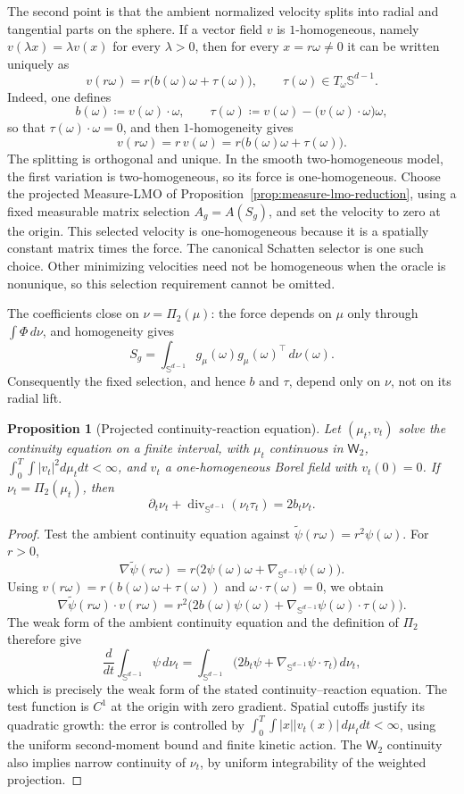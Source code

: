 \documentclass{article}
\newtheorem{proposition}[theorem]{Proposition}
\newcommand{\Sd}{\mathbb{S}^{d-1}}
\newcommand{\Wtwo}{\mathsf{W}_2}
\newcommand{\divS}{\operatorname{div}_{\Sd}}
\newcommand{\nablaS}{\nabla_{\Sd}}
\begin{document}
The second point is that the ambient normalized velocity splits into radial and tangential parts on the sphere. If a vector field $v$ is $1$-homogeneous, namely $v(\lambda x)=\lambda v(x)$ for every $\lambda>0$, then for every $x=r\omega\neq 0$ it can be written uniquely as
$$
v(r\omega)=r\bigl(b(\omega)\omega+\tau(\omega)\bigr),
\qquad
\tau(\omega)\in T_\omega \Sd.
$$
Indeed, one defines
$$
b(\omega)\coloneqq v(\omega)\cdot \omega,
\qquad
\tau(\omega)\coloneqq v(\omega)-\bigl(v(\omega)\cdot \omega\bigr)\omega,
$$
so that $\tau(\omega)\cdot \omega=0$, and then $1$-homogeneity gives
$$
v(r\omega)=r\,v(\omega)=r\bigl(b(\omega)\omega+\tau(\omega)\bigr).
$$
The splitting is orthogonal and unique. In the smooth two-homogeneous model,
the first variation is two-homogeneous, so its force is one-homogeneous.
Choose the projected Measure-LMO of
Proposition~\ref{prop:measure-lmo-reduction}, using a fixed measurable matrix
selection $A_g=A(S_g)$, and set the velocity to zero at the origin.
This selected velocity is one-homogeneous because it is a spatially constant
matrix times the force. The canonical Schatten selector is one such choice.
Other minimizing velocities need not be homogeneous when the oracle is
nonunique, so this selection requirement cannot be omitted.

The coefficients close on $\nu=\Pi_2(\mu)$: the force depends on $\mu$ only
through $\int\Phi\,d\nu$, and homogeneity gives
\[
 S_g=\int_{\Sd}g_\mu(\omega)g_\mu(\omega)^\top\,d\nu(\omega).
\]
Consequently the fixed selection, and hence $b$ and $\tau$, depend only on
$\nu$, not on its radial lift.
\begin{proposition}[Projected continuity-reaction equation]
\label{prop:sphere}
Let $(\mu_t,v_t)$ solve the continuity equation on a finite interval, with
$\mu_t$ continuous in $\Wtwo$, $\int_0^T\int|v_t|^2d\mu_tdt<\infty$, and
$v_t$ a one-homogeneous Borel field with $v_t(0)=0$. If
$\nu_t=\Pi_2(\mu_t)$, then
$$
\partial_t\nu_t+\divS(\nu_t\tau_t)=2b_t\nu_t.
$$
\end{proposition}

\begin{proof}
Test the ambient continuity equation against
$\widetilde\psi(r\omega)=r^2\psi(\omega)$. For $r>0$,
\[
 \nabla\widetilde\psi(r\omega)
 =r\bigl(2\psi(\omega)\omega+\nablaS\psi(\omega)\bigr).
\]
Using $v(r\omega)=r(b(\omega)\omega+\tau(\omega))$ and
$\omega\cdot\tau(\omega)=0$, we obtain
\[
 \nabla\widetilde\psi(r\omega)\cdot v(r\omega)
 =r^2\bigl(2b(\omega)\psi(\omega)
            +\nablaS\psi(\omega)\cdot\tau(\omega)\bigr).
\]
The weak form of the ambient continuity equation and the definition of
$\Pi_2$ therefore give
\[
 \frac{d}{dt}\int_{\Sd}\psi\,d\nu_t
 =\int_{\Sd}
   \bigl(2b_t\psi+\nablaS\psi\cdot\tau_t\bigr)\,d\nu_t,
\]
which is precisely the weak form of the stated continuity--reaction equation.
The test function is $C^1$ at the origin with zero gradient. Spatial cutoffs
justify its quadratic growth: the error is controlled by
$\int_0^T\int |x||v_t(x)|\,d\mu_tdt<\infty$, using the uniform second-moment
bound and finite kinetic action. The $\Wtwo$ continuity also implies narrow
continuity of $\nu_t$, by uniform integrability of the weighted projection.
\end{proof}
\end{document}
